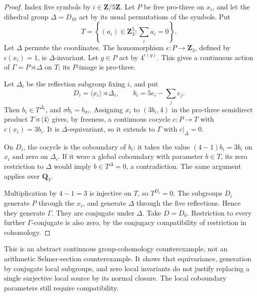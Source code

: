 \begin{proof}
Index five symbols by \(i\in\mathbf Z/5\mathbf Z\). Let \(P\) be free
pro-three on \(x_i\), and let the dihedral group \(\Delta=D_{10}\) act
by its usual permutations of the symbols. Put
\[
 T=\left\{(a_i)\in\mathbf Z_3^5:\sum_i a_i=0\right\}.
\]
Let \(\Delta\) permute the coordinates. The homomorphism
\(\epsilon:P\to\mathbf Z_3\), defined by \(\epsilon(x_i)=1\), is
\(\Delta\)-invariant. Let \(g\in P\) act by \(4^{\epsilon(g)}\).
This gives a continuous action of \(\Gamma=P\rtimes\Delta\) on \(T\);
its \(P\)-image is pro-three.

Let \(\Delta_i\) be the reflection subgroup fixing \(i\), and put
\[
 D_i=\langle x_i\rangle\rtimes\Delta_i,\qquad
 b_i=5e_i-\sum_j e_j .
\]
Then \(b_i\in T^{\Delta_i}\), and \(\sigma b_i=b_{\sigma i}\).
Assigning \(x_i\) to \((3b_i,4)\) in the pro-three semidirect product
\(T\rtimes\overline{\langle4\rangle}\) gives, by freeness, a continuous
cocycle \(c:P\to T\) with \(c(x_i)=3b_i\). It is
\(\Delta\)-equivariant, so it extends to \(\Gamma\) with \(c|_\Delta=0\).

On \(D_i\), the cocycle is the coboundary of \(b_i\): it takes the value
\((4-1)b_i=3b_i\) on \(x_i\) and zero on \(\Delta_i\).
If it were a global coboundary with parameter \(b\in T\), its zero
restriction to \(\Delta\) would imply \(b\in T^\Delta=0\), a
contradiction. The same argument applies over \(\mathbf Q_3\).

Multiplication by \(4-1=3\) is injective on \(T\), so \(T^{D_i}=0\).
The subgroups \(D_i\) generate \(P\) through the \(x_i\), and generate
\(\Delta\) through the five reflections. Hence they generate \(\Gamma\).
They are conjugate under \(\Delta\). Take \(D=D_0\).
Restriction to every further \(\Gamma\)-conjugate is also zero, by
the conjugacy compatibility of restriction in cohomology.
\end{proof}

\begin{remark}\label{rem:conjugate-source-scope}
This is an abstract continuous group-cohomology counterexample, not an
arithmetic Selmer-section counterexample. It shows that equivariance,
generation by conjugate local subgroups, and zero local invariants do
not justify replacing a single surjective local source by its normal
closure. The local coboundary parameters still require compatibility.
\end{remark}

